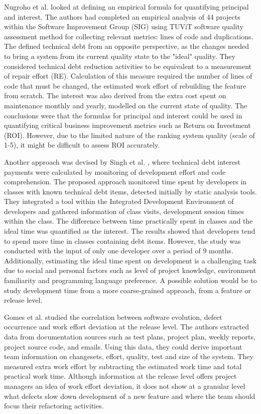 \documentclass{mprop}
\begin{document}
Nugroho et al. \cite{Nugroho2011} looked at defining an empirical formula for
quantifying principal and interest. The authors had completed an empirical
analysis of 44 projects within the Software Improvement Group (SIG) using TUViT
software quality assessment method for collecting relevant metrics: lines of
code and duplications. The defined technical debt from an opposite perspective,
as the changes needed to bring a system from its current quality state to the
"ideal" quality. They considered technical debt reduction activities to be
equivalent to a measurement of repair effort (RE). Calculation of this measure
required the number of lines of code that must be changed, the estimated work
effort of rebuilding the feature from scratch. The interest was also derived
from the extra cost spent on maintenance monthly and yearly, modelled on the
current state of quality. The conclusions were that the formulas for principal
and interest could be used in quantifying critical business improvement metrics
such as Return on Investment (ROI). However, due to the limited nature of the
ranking system quality (scale of 1-5), it might be difficult to assess ROI
accurately.


Another approach was devised by Singh et al. \cite{Singh2014}, where technical
debt interest payments were calculated by monitoring of development effort and
code comprehension. The proposed approach monitored time spent by developers in
classes with known technical debt items, detected initially by static analysis
tools. They integrated a tool within the Integrated Development Environment of
developers and gathered information of class visits, development session times
within the class. The difference between time practically spent in classes and
the ideal time was quantified as the interest. The results showed that
developers tend to spend more time in classes containing debt items. However,
the study was conducted with the input of only one developer over a period of 9
months. Additionally, estimating the ideal time spent on development is a
challenging task due to social and personal factors such as level of project
knowledge, environment familiarity and programming language preference. A
possible solution would be to study development time from a more coarse-grained
approach, from a feature or release level.

Gomes et al. \cite{Gomes2011} studied the correlation between software
evolution, defect occurrence and work effort deviation at the release level. The
authors extracted data from documentation sources such as test plans, project
plan, weekly reports, project source code, and emails. Using this data, they
could derive important team information on changesets, effort, quality, test and
size of the system. They measured extra work effort by subtracting the estimated
work time and total practical work time. Although information at the release
level offers project managers an idea of work effort deviation, it does not show
at a granular level what defects slow down development of a new feature and
where the team should focus their refactoring activities.
\end{document}
